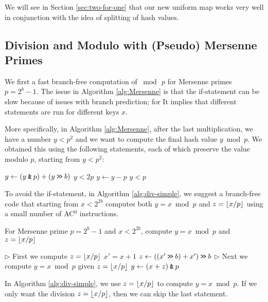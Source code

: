 We will see in Section \ref{sec:two-for-one} that our new uniform map
works very well in conjunction with the idea of splitting of hash values.




\subsection{Division and Modulo with (Pseudo) Mersenne Primes}\label{subsec:intro-division}

We first a fast branch-free computation of $\bmod\,p$ for
Mersenne primes $p=2^b-1$. The issue in Algorithm \ref{alg:Mersenne}
is that the if-statement can be slow because of issues with branch
prediction; for It implies that different statements are run for
different keys $x$.

More specifically, in Algorithm \ref{alg:Mersenne}, after the last
multiplication, we have a number $y<p^2$ and we want to compute the
final hash value $y\bmod p$. We obtained this using the following
statements, each of which preserve the value modulo $p$, starting from
$y<p^2$:
\begin{algorithmic}
   \State $y \gets (y\mathbin{\texttt{\&}} p)+(y\mathbin{\texttt{>\!>}} b)$
   \Comment $y<2p$
   \State $y\gets y-p$
   \Comment  $y<p$
   \EndIf
\end{algorithmic}
To avoid the if-statement, in Algorithm \ref{alg:div-simple}, we suggest
a branch-free code that starting
from $x<2^{2b}$ computes both $y=x\bmod p$ and $z=\lfloor {x/p} \rfloor$ using
a small number of AC$^0$ instructions. 
\begin{algorithm}[H]
   \caption{For Mersenne prime $p=2^b-1$ and $x< 2^{2b}$, compute
   \label{alg:div-simple}
   $y=x\bmod p$ and $z=\lfloor {x/p} \rfloor$}
   \begin{algorithmic}
      \State $\rhd$ First we compute $z=\lfloor {x/p} \rfloor$
      \State $x'=x+1$
      \State $z \gets(( x' \mathbin{\texttt{>\!>}} b)+x')\mathbin{\texttt{>\!>}} b$
      \State $\rhd$ Next we compute $y=x\bmod p$ given $z=\lfloor {x/p} \rfloor$
      \State $y \gets (x + z) \mathbin{\texttt{\&}} p $
   \end{algorithmic}
\end{algorithm}
In Algorithm \ref{alg:div-simple}, we use
$z=\lfloor {x/p} \rfloor$ to compute $y=x\bmod p$. If we only want the
division $z=\lfloor {x/p} \rfloor$, then we can skip the last statement.

